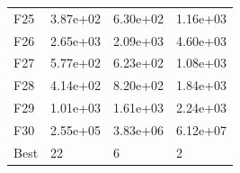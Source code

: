 \begin{table}[H]
\begin{minipage}{.5\linewidth}
\begin{tabular}{llll}
            F25  &  3.87e+02 &  6.30e+02 &  1.16e+03 \\
            F26  &  2.65e+03 &  2.09e+03 &  4.60e+03 \\
            F27  &  5.77e+02 &  6.23e+02 &  1.08e+03 \\
            F28  &  4.14e+02 &  8.20e+02 &  1.84e+03 \\
            F29  &  1.01e+03 &  1.61e+03 &  2.24e+03 \\
            F30  &  2.55e+05 &  3.83e+06 &  6.12e+07 \\
            Best &        22 &         6 &         2 \\
            \bottomrule
            \end{tabular}
            
    \end{minipage} 
\end{table}

